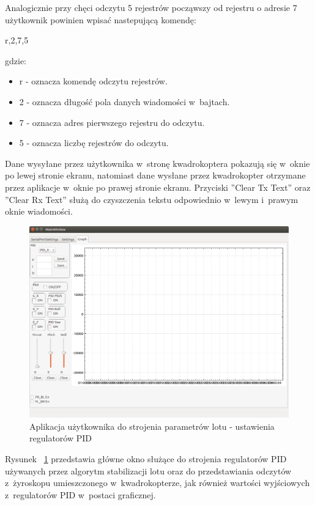 \documentclass[11pt, twoside]{Thesis} %
\begin{document}
Analogicznie przy chęci odczytu 5 rejestrów począwszy od rejestru o adresie 7 użytkownik powinien wpisać nastepującą komendę:

r,2,7,5

gdzie:
\begin{itemize}
	\item r - oznacza komendę odczytu rejestrów.
	\item 2 - oznacza długość pola danych wiadomości w~bajtach.
	\item 7 - oznacza adres pierwszego rejestru do odczytu.
	\item 5 - oznacza liczbę rejestrów do odczytu.
\end{itemize}
Dane wysyłane przez użytkownika w~stronę kwadrokoptera pokazują się w~oknie po lewej stronie ekranu, natomiast dane wysłane przez kwadrokopter  otrzymane przez aplikacje w~oknie po prawej stronie ekranu. Przyciski ''Clear Tx Text'' oraz ''Clear Rx Text'' służą do czyszczenia tekstu odpowiednio w~lewym i~prawym oknie wiadomości. 

\begin{figure}[H]
	\centering
	\includegraphics[scale=0.4]{Pictures/QuadroTune/QuadroTuneGraph.png}
	\caption[Aplikacja użytkownika do strojenia parametrów lotu - ustawienia regulatorów PID]{Aplikacja użytkownika do strojenia parametrów lotu - ustawienia regulatorów PID}
	\label{fig:QuadroTune_screen3}
\end{figure}

Rysunek ~\ref{fig:QuadroTune_screen3} przedstawia główne okno służące do strojenia regulatorów PID używanych przez algorytm stabilizacji lotu oraz do przedstawiania odczytów z~żyroskopu umieszczonego w~kwadrokopterze, jak również wartości wyjściowych z~regulatorów PID w~postaci graficznej.
\end{document}
